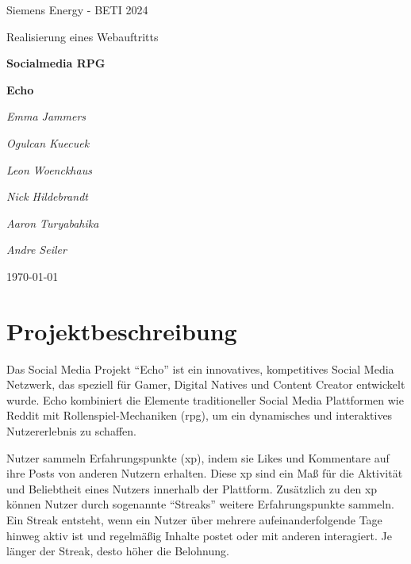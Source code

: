 \documentclass[a4paper,12pt]{article}
\begin{document}
\begin{titlepage}
	\centering
	{\LARGE Siemens Energy - BETI 2024 \par}
	\vspace{0.5cm}
	{\Large Realisierung eines Webauftritts \par}
	\vspace{3.5cm}
	{\huge\bfseries Socialmedia RPG \par}
	{\huge\bfseries Echo \par}
	\vspace{3cm}
	{\Large\itshape Emma Jammers \par}
	{\Large\itshape Ogulcan Kuecuek \par}
	{\Large\itshape Leon Woenckhaus \par}
	{\Large\itshape Nick Hildebrandt \par}
	{\Large\itshape Aaron Turyabahika \par}
	{\Large\itshape Andre Seiler \par}
	\vfill
	{\large \today\par}
\end{titlepage}
\newpage

\tableofcontents
\newpage

\listoffigures
\newpage

\printglossary[type=\acronymtype, title=Abkürzungsverzeichnis]
\newpage

\setcounter{page}{1}

\section{Projektbeschreibung}
Das Social Media Projekt “Echo” ist ein
innovatives, kompetitives Social Media Netzwerk, das speziell für Gamer,
Digital Natives und Content Creator entwickelt wurde. Echo kombiniert die
Elemente traditioneller Social Media Plattformen wie Reddit mit
Rollenspiel-Mechaniken (\gls{rpg}), um ein dynamisches und interaktives
Nutzererlebnis zu schaffen.

Nutzer sammeln Erfahrungspunkte (\gls{xp}), indem sie Likes und Kommentare auf
ihre Posts von anderen Nutzern erhalten. Diese \gls{xp} sind ein Maß für die
Aktivität und Beliebtheit eines Nutzers innerhalb der Plattform. Zusätzlich zu
den \gls{xp} können Nutzer durch sogenannte “Streaks” weitere Erfahrungspunkte
sammeln. Ein Streak entsteht, wenn ein Nutzer über mehrere aufeinanderfolgende
Tage hinweg aktiv ist und regelmäßig Inhalte postet oder mit anderen
interagiert. Je länger der Streak, desto höher die Belohnung.
\end{document}
